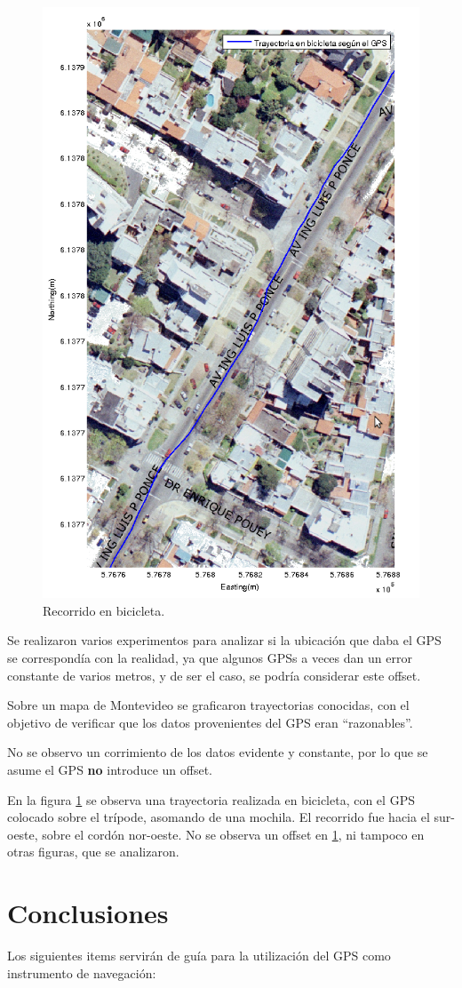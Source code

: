 \documentclass[main]{subfiles}
\begin{document}
\begin{figure}
  \begin{center}
\vspace{-80pt}
  \includegraphics[height=.5\textwidth]{./pics_gps/ponce.png}
  \end{center}
\vspace{-20pt}
  \caption{Recorrido en bicicleta.}
  \label{fig:ponce.png}
\vspace{-10pt}
\end{figure}

Se realizaron varios experimentos para analizar si la ubicación que daba el GPS se correspondía con la realidad, ya que algunos GPSs a veces dan un error constante de varios metros, y de ser el caso, se podría considerar este offset.

Sobre un mapa de Montevideo se graficaron trayectorias conocidas, con el objetivo de verificar que los datos provenientes del GPS eran ``razonables''.

No se observo un corrimiento de los datos evidente y constante, por lo que se asume el GPS \textbf{no} introduce un offset.

En la figura \ref{fig:ponce.png} se observa una trayectoria realizada en bicicleta, con el GPS colocado sobre el trípode, asomando de una mochila. El recorrido fue hacia el sur-oeste, sobre el cord\'on nor-oeste. No se observa un offset en \ref{fig:ponce.png}, ni tampoco en otras figuras, que se analizaron.

\section{Conclusiones}
\label{sec:conclusion}

Los siguientes items servirán de guía para la utilización del GPS como instrumento de navegación:
\end{document}
